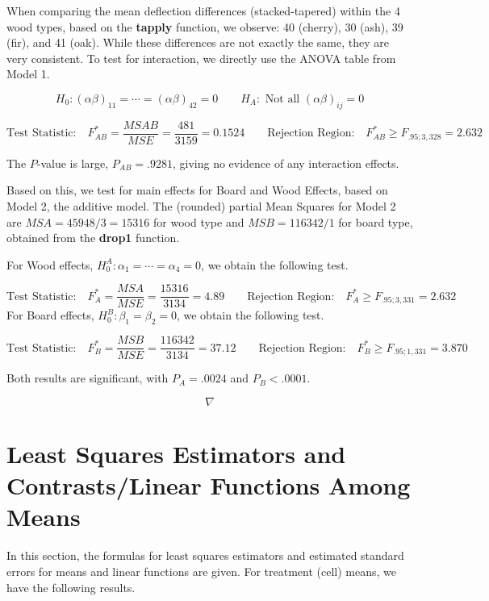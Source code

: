 \documentclass[
]{book}
\begin{document}
When comparing the mean deflection differences (stacked-tapered) within
the 4 wood types, based on the \textbf{tapply} function, we observe: 40
(cherry), 30 (ash), 39 (fir), and 41 (oak). While these differences are
not exactly the same, they are very consistent. To test for interaction,
we directly use the ANOVA table from Model 1.

\[
H_0: (\alpha\beta)_{11}= \cdots = (\alpha\beta)_{42}=0 \qquad
H_A:\mbox{ Not all } (\alpha\beta)_{ij}= 0
\]

\[
\mbox{Test Statistic:} \quad F_{AB}^*=\frac{MSAB}{MSE}=\frac{481}{3159}=0.1524
\qquad
\mbox{Rejection Region:}\quad F_{AB}^*\ge F_{.95;3,328}=2.632
\]

The \(P\)-value is large, \(P_{AB}=.9281\), giving no evidence of any
interaction effects.

Based on this, we test for main effects for Board and Wood Effects,
based on Model 2, the additive model. The (rounded) partial Mean Squares
for Model 2 are \(MSA=45948/3=15316\) for wood type and \(MSB=116342/1\)
for board type, obtained from the \textbf{drop1} function.

For Wood effects, \(H_0^A:\alpha_1=\cdots = \alpha_4=0\), we obtain the
following test.

\[
\mbox{Test Statistic:} \quad F_{A}^*=\frac{MSA}{MSE}=\frac{15316}{3134}=4.89
\qquad
\mbox{Rejection Region:}\quad F_{A}^*\ge F_{.95;3,331}=2.632
\] For Board effects, \(H_0^B:\beta_1=\beta_2=0\), we obtain the
following test.

\[
\mbox{Test Statistic:} \quad F_{B}^*=\frac{MSB}{MSE}=\frac{116342}{3134}=37.12
\qquad
\mbox{Rejection Region:}\quad F_{B}^*\ge F_{.95;1,331}=3.870
\]

Both results are significant, with \(P_A=.0024\) and \(P_B<.0001\).

\[\nabla\]

\section{Least Squares Estimators and Contrasts/Linear Functions Among
Means}\label{least-squares-estimators-and-contrastslinear-functions-among-means}

In this section, the formulas for least squares estimators and estimated
standard errors for means and linear functions are given. For treatment
(cell) means, we have the following results.
\end{document}

